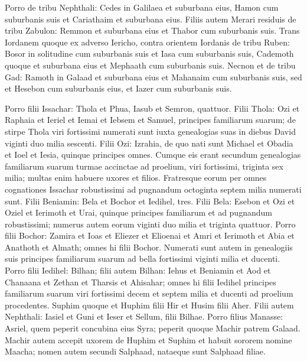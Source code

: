 \begin{biblechapter}
\begin{biblechapter}
\begin{biblechapter}
\begin{biblechapter}
\begin{biblechapter}
\begin{biblechapter}
\verse Porro de tribu Nephthali: Cedes in Galilaea et suburbana eius, Hamon cum suburbanis suis et Cariathaim et suburbana eius.
 \verse Filiis autem Merari residuis de tribu Zabulon: Remmon et suburbana eius et Thabor cum suburbanis suis. 
\verse Trans Iordanem quoque ex adverso Iericho, contra orientem Iordanis de tribu Ruben: Bosor in solitudine cum suburbanis suis et Iasa cum suburbanis suis, 
\verse Cademoth quoque et suburbana eius et Mephaath cum suburbanis suis. 
\verse Necnon et de tribu Gad: Ramoth in Galaad et suburbana eius et Mahanaim cum suburbanis suis, 
\verse sed et Hesebon cum suburbanis eius, et Iazer cum suburbanis suis.
 
\begin{biblechapter}
\verse Porro filii Issachar: Thola et Phua, Iasub et Semron, quattuor. 
\verse Filii Thola: Ozi et Raphaia et Ieriel et Iemai et Iebsem et Samuel, principes familiarum suarum; de stirpe Thola viri fortissimi numerati sunt iuxta genealogias suas in diebus David viginti duo milia sescenti. 
\verse Filii Ozi: Izrahia, de quo nati sunt Michael et Obadia et Ioel et Iesia, quinque principes omnes. 
\verse Cumque eis erant secundum genealogias familiarum suarum turmae accinctae ad proelium, viri fortissimi, triginta sex milia; multas enim habuere uxores et filios. 
\verse Fratresque eorum per omnes cognationes Issachar robustissimi ad pugnandum octoginta septem milia numerati sunt.
 \verse Filii Beniamin: Bela et Bochor et Iedihel, tres. 
\verse Filii Bela: Esebon et Ozi et Oziel et Ierimoth et Urai, quinque principes familiarum et ad pugnandum robustissimi; numerus autem eorum viginti duo milia et triginta quattuor. 
\verse Porro filii Bochor: Zamira et Ioas et Eliezer et Elioenai et Amri et Ierimoth et Abia et Anathoth et Almath; omnes hi filii Bochor. 
\verse Numerati sunt autem in genealogiis suis principes familiarum suarum ad bella fortissimi viginti milia et ducenti. 
\verse Porro filii Iedihel: Bilhan; filii autem Bilhan: Iehus et Beniamin et Aod et Chanaana et Zethan et Tharsis et Ahisahar; 
\verse omnes hi filii Iedihel principes familiarum suarum viri fortissimi decem et septem milia et ducenti ad proelium procedentes. 
\verse Suphim quoque et Huphim filii Hir et Husim filii Aher.
 \verse Filii autem Nephthali: Iasiel et Guni et Ieser et Sellum, filii Bilhae.
 \verse Porro filius Manasse: Asriel, quem peperit concubina eius Syra; peperit quoque Machir patrem Galaad. 
\verse Machir autem accepit uxorem de Huphim et Suphim et habuit sororem nomine Maacha; nomen autem secundi Salphaad, nataeque sunt Salphaad filiae. 

\end{biblechapter}
\end{biblechapter}
\end{biblechapter}
\end{biblechapter}
\end{biblechapter}
\end{biblechapter}
\end{biblechapter}
